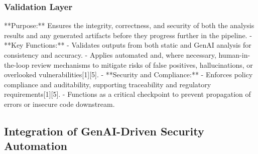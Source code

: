 
\subsubsection{Validation Layer} %
\label{sec:Validation Layer}

 **Purpose:**  
  Ensures the integrity, correctness, and security of both the analysis results and any generated artifacts before they progress further in the pipeline.
- **Key Functions:**  
  - Validates outputs from both static and GenAI analysis for consistency and accuracy.
  - Applies automated and, where necessary, human-in-the-loop review mechanisms to mitigate risks of false positives, hallucinations, or overlooked vulnerabilities[1][5].
- **Security and Compliance:**  
  - Enforces policy compliance and auditability, supporting traceability and regulatory requirements[1][5].
  - Functions as a critical checkpoint to prevent propagation of errors or insecure code downstream.




\subsection{Integration of GenAI-Driven Security Automation} %
\label{sub:Integration of GenAI-Driven Security Automation}



